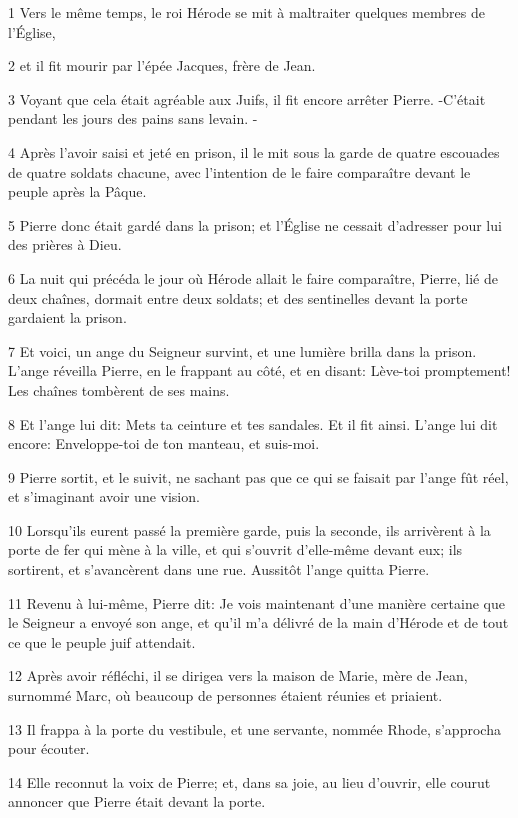 \par 1 Vers le même temps, le roi Hérode se mit à maltraiter quelques membres de l'Église,
\par 2 et il fit mourir par l'épée Jacques, frère de Jean.
\par 3 Voyant que cela était agréable aux Juifs, il fit encore arrêter Pierre. -C'était pendant les jours des pains sans levain. -
\par 4 Après l'avoir saisi et jeté en prison, il le mit sous la garde de quatre escouades de quatre soldats chacune, avec l'intention de le faire comparaître devant le peuple après la Pâque.
\par 5 Pierre donc était gardé dans la prison; et l'Église ne cessait d'adresser pour lui des prières à Dieu.
\par 6 La nuit qui précéda le jour où Hérode allait le faire comparaître, Pierre, lié de deux chaînes, dormait entre deux soldats; et des sentinelles devant la porte gardaient la prison.
\par 7 Et voici, un ange du Seigneur survint, et une lumière brilla dans la prison. L'ange réveilla Pierre, en le frappant au côté, et en disant: Lève-toi promptement! Les chaînes tombèrent de ses mains.
\par 8 Et l'ange lui dit: Mets ta ceinture et tes sandales. Et il fit ainsi. L'ange lui dit encore: Enveloppe-toi de ton manteau, et suis-moi.
\par 9 Pierre sortit, et le suivit, ne sachant pas que ce qui se faisait par l'ange fût réel, et s'imaginant avoir une vision.
\par 10 Lorsqu'ils eurent passé la première garde, puis la seconde, ils arrivèrent à la porte de fer qui mène à la ville, et qui s'ouvrit d'elle-même devant eux; ils sortirent, et s'avancèrent dans une rue. Aussitôt l'ange quitta Pierre.
\par 11 Revenu à lui-même, Pierre dit: Je vois maintenant d'une manière certaine que le Seigneur a envoyé son ange, et qu'il m'a délivré de la main d'Hérode et de tout ce que le peuple juif attendait.
\par 12 Après avoir réfléchi, il se dirigea vers la maison de Marie, mère de Jean, surnommé Marc, où beaucoup de personnes étaient réunies et priaient.
\par 13 Il frappa à la porte du vestibule, et une servante, nommée Rhode, s'approcha pour écouter.
\par 14 Elle reconnut la voix de Pierre; et, dans sa joie, au lieu d'ouvrir, elle courut annoncer que Pierre était devant la porte.
